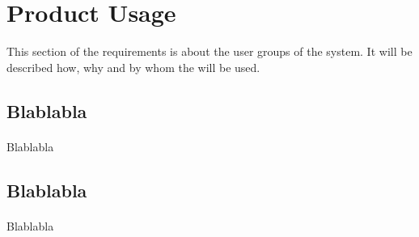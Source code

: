 \section{Product Usage}
   This section of the requirements is about the user groups of the system. It will be described how, why and by whom the \app will be used. 

\subsection{Blablabla}
\paragraph{}Blablabla

\subsection{Blablabla}
\paragraph{}Blablabla
